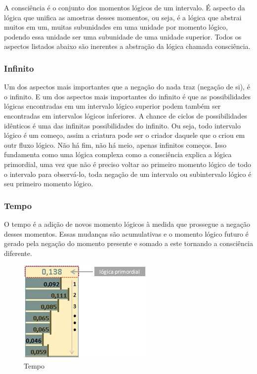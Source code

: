 A consciência é o conjunto dos momentos lógicos de um intervalo. É aspecto da lógica que unifica as amostras desses momentos, ou seja, é a lógica que abstrai muitos em um, muitas subunidades em uma unidade por momento lógico, podendo essa unidade ser uma subunidade de uma unidade superior. Todos os aspectos listados abaixo são inerentes a abstração da lógica chamada consciência.

\subsubsection{Infinito}
Um dos aspectos mais importantes que a negação do nada traz (negação de si), é o infinito. E um dos aspectos mais importantes do infinito é que as possibilidades lógicas encontradas em um intervalo lógico superior podem também ser encontradas em intervalos lógicos inferiores. A chance de ciclos de possibilidades idênticos é uma das infinitas possibilidades do infinito. Ou seja, todo intervalo lógico é um começo, assim a criatura pode ser o criador daquele que o criou em outr fluxo lógico. Não há fim, não há meio, apenas infinitos começos. Isso fundamenta como uma lógica complexa como a consciência explica a lógica primordial, uma vez que não é preciso voltar ao primeiro momento lógico de todo o intervalo para observá-lo, toda negação de um intervalo  ou subintervalo lógico é seu primeiro momento lógico.

\subsubsection{Tempo}
O tempo é a adição de novos momento lógicos à medida que prossegue a negação desses momentos.  Essas mudanças são acumulativas e o momento lógico futuro é gerado pela negação do momento presente e somado a este tornando a consciência diferente.

\begin{figure}[H]
\caption{Tempo}
\label{fig:consciousness_time}
\centering
\includegraphics[scale=1]{sections/images/consciousness_time.jpg}
\end{figure}

